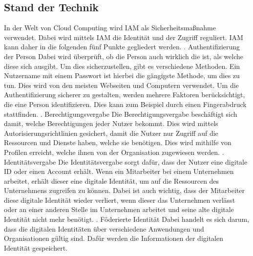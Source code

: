 \subsection{Stand der Technik}
\label{sec:chapter04:Stand}
In der Welt von Cloud Computing wird \ac{IAM} als Sicherheitsmaßnahme verwendet.
Dabei wird mittels \ac{IAM} die Identität und der Zugriff reguliert.
\ac{IAM} kann daher in die folgenden fünf Punkte gegliedert werden.
\newline
{}. Authentifizierung der Person
\newline
Dabei wird überprüft, ob die Person auch wirklich die ist, als welche diese sich ausgibt.
Um dies sicherzustellen, gibt es verschiedene Methoden.
Ein Nutzername mit einem Passwort ist hierbei die gängigste Methode, um dies zu tun. Dies wird von den meisten Webseiten und Computern verwendet.
Um die Authentifizierung sicherer zu gestalten, werden mehrere Faktoren berücksichtigt, die eine Person identifizieren.
Dies kann zum Beispiel durch einen Fingerabdruck stattfinden. \cite[1482]{IamIEEE} 
\newline
{}. Berechtigungsvergabe
\newline
Die Berechtigungsvergabe beschäftigt sich damit, welche Berechtigungen jeder Nutzer bekommt.
Dies wird mittels Autorisierungsrichtlinien gesichert, damit die Nutzer nur Zugriff auf die Ressourcen und Dienste haben, welche sie benötigen.
Dies wird mithilfe von Profilen erreicht, welche ihnen von der Organisation zugewiesen werden. \cite[1482]{IamIEEE} 
\newline
{}. Identitätsvergabe
\newline
Die Identitätsvergabe sorgt dafür, dass der Nutzer eine digitale ID oder einen Account erhält.
Wenn ein Mitarbeiter bei einem Unternehmen arbeitet, erhält dieser eine digitale Identität, um auf die Ressourcen des Unternehmens zugreifen zu können.
Dabei ist auch wichtig, dass der Mitarbeiter diese digitale Identität wieder verliert, wenn dieser das Unternehmen verlässt oder an einer anderen Stelle im Unternehmen arbeitet und seine alte digitale Identität nicht mehr benötigt. \cite[1482]{IamIEEE}
\newline
{}. Föderierte Identität
\newline
Dabei handelt es sich darum, dass die digitalen Identitäten über verschiedene Anwendungen und Organisationen gültig sind.
Dafür werden die Informationen der digitalen Identität gespeichert.
